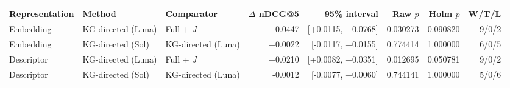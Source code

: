 \begin{tabular}{@{}lllrrrrr@{}}
\toprule
Representation & Method & Comparator & $\Delta$ nDCG@5 & 95\% interval & Raw $p$ & Holm $p$ & W/T/L \\
\midrule
Embedding & KG-directed (Luna) & Full + $J$ & +0.0447 & [+0.0115, +0.0768] & 0.030273 & 0.090820 & 9/0/2 \\
Embedding & KG-directed (Sol) & KG-directed (Luna) & +0.0022 & [-0.0117, +0.0155] & 0.774414 & 1.000000 & 6/0/5 \\
Descriptor & KG-directed (Luna) & Full + $J$ & +0.0210 & [+0.0082, +0.0351] & 0.012695 & 0.050781 & 9/0/2 \\
Descriptor & KG-directed (Sol) & KG-directed (Luna) & -0.0012 & [-0.0077, +0.0060] & 0.744141 & 1.000000 & 5/0/6 \\
\bottomrule
\end{tabular}

